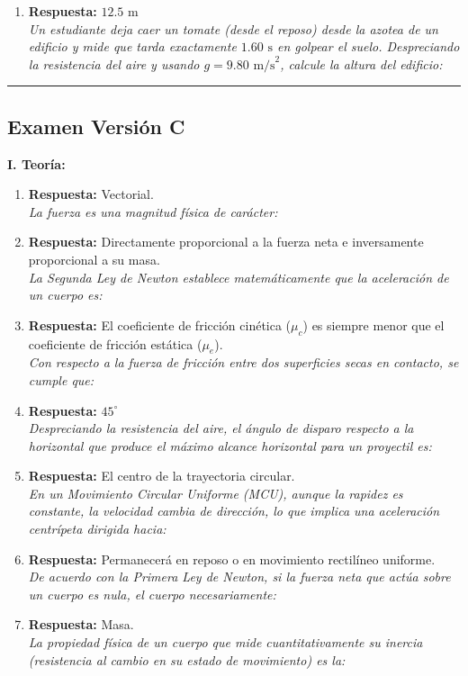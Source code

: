 \documentclass[11pt,a4paper]{article}
\begin{document}
\begin{enumerate}
    \item \textbf{Respuesta:} $12.5 \text{ m}$ \\ \textit{Un estudiante deja caer un tomate (desde el reposo) desde la azotea de un edificio y mide que tarda exactamente $1.60 \text{ s}$ en golpear el suelo. Despreciando la resistencia del aire y usando $g = 9.80 \text{ m/s}^2$, calcule la altura del edificio:}
\end{enumerate}\vspace{0.4cm} \hrule \vspace{0.4cm}\subsection*{Examen Versión C}\textbf{I. Teoría:}\begin{enumerate}    \item \textbf{Respuesta:} Vectorial. \\ \textit{La fuerza es una magnitud física de carácter:}
    \item \textbf{Respuesta:} Directamente proporcional a la fuerza neta e inversamente proporcional a su masa. \\ \textit{La Segunda Ley de Newton establece matemáticamente que la aceleración de un cuerpo es:}
    \item \textbf{Respuesta:} El coeficiente de fricción cinética ($\mu_c$) es siempre menor que el coeficiente de fricción estática ($\mu_e$). \\ \textit{Con respecto a la fuerza de fricción entre dos superficies secas en contacto, se cumple que:}
    \item \textbf{Respuesta:} $45^\circ$ \\ \textit{Despreciando la resistencia del aire, el ángulo de disparo respecto a la horizontal que produce el máximo alcance horizontal para un proyectil es:}
    \item \textbf{Respuesta:} El centro de la trayectoria circular. \\ \textit{En un Movimiento Circular Uniforme (MCU), aunque la rapidez es constante, la velocidad cambia de dirección, lo que implica una aceleración centrípeta dirigida hacia:}
    \item \textbf{Respuesta:} Permanecerá en reposo o en movimiento rectilíneo uniforme. \\ \textit{De acuerdo con la Primera Ley de Newton, si la fuerza neta que actúa sobre un cuerpo es nula, el cuerpo necesariamente:}
    \item \textbf{Respuesta:} Masa. \\ \textit{La propiedad física de un cuerpo que mide cuantitativamente su inercia (resistencia al cambio en su estado de movimiento) es la:}

\end{enumerate}
\end{document}
